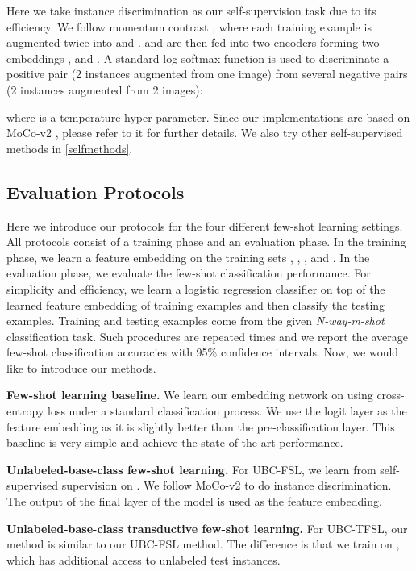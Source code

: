 \documentclass[final]{cvpr}
\newcommand{\subsecvspace}{\vspace{-0.0em}}
\begin{document}
Here we take instance discrimination as our self-supervision task due to its efficiency.
We follow momentum contrast \cite{he2020momentum}, where each training example  is augmented twice into  and .  and  are then fed into two encoders forming two embeddings , and . A standard log-softmax function is used to discriminate a positive pair (2 instances augmented from one image) from several negative pairs (2 instances augmented from  2 images):

where  is a temperature hyper-parameter. Since our implementations are based on MoCo-v2 \cite{chen2020mocov2}, please refer to it for further details. We also try other self-supervised methods in \cref{selfmethods}.

\subsecvspace
\subsection{Evaluation Protocols}
\subsecvspace

Here we introduce our protocols for the four different few-shot learning settings. 
All protocols consist of a training phase and an evaluation phase. In the training phase, we learn a feature embedding on the training sets , , , and . In the evaluation phase, we evaluate the few-shot classification performance.
For simplicity and efficiency, we learn a logistic regression classifier on top of the learned feature embedding of  training examples and then classify the testing examples. 
Training and testing examples come from the given \emph{N-way-m-shot} classification task. Such procedures are repeated  times and we report the average few-shot classification accuracies with 95\% confidence intervals. Now, we would like to introduce our methods.

\textbf{Few-shot learning baseline.} 
We learn our embedding network on  using cross-entropy loss under a standard classification process. We use the logit layer as the feature embedding as it is slightly better than the pre-classification layer. This baseline is very simple and achieve the state-of-the-art performance. 



\textbf{Unlabeled-base-class few-shot learning.} For UBC-FSL, we learn from self-supervised supervision on . We follow MoCo-v2 to do instance discrimination. The output of the final layer of the model is used as the feature embedding. 

\textbf{Unlabeled-base-class transductive few-shot learning.} For UBC-TFSL, our method is similar to our UBC-FSL method. The difference is that we train on , which has additional access to unlabeled test instances. 
\end{document}
